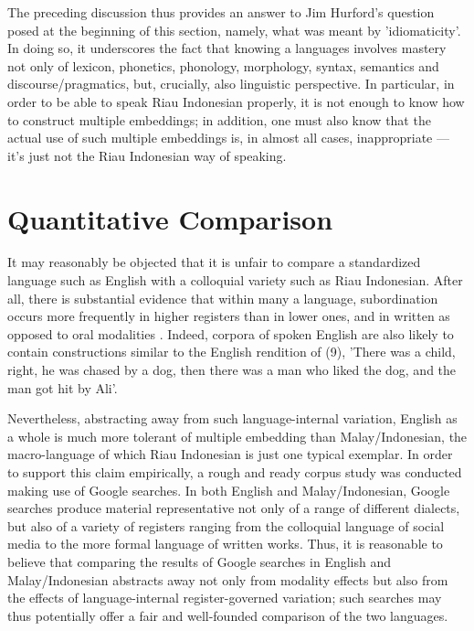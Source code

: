 \documentclass[output=paper,colorlinks,citecolor=brown
]{langscibook}
\begin{document}
The preceding discussion thus provides an answer to Jim Hurford's question posed at the beginning of this section, namely, what was meant by 'idiomaticity'.  In doing so, it underscores the fact that knowing a languages involves mastery not only of lexicon, phonetics, phonology, morphology, syntax, semantics and discourse/pragmatics, but, crucially, also linguistic perspective.  In particular, in order to be able to speak Riau Indonesian properly, it is not enough to know how to construct multiple embeddings; in addition, one must also know that the actual use of such multiple embeddings is, in almost all cases, inappropriate — it's just not the Riau Indonesian way of speaking.

\section{Quantitative Comparison}
It may reasonably be objected that it is unfair to compare a standardized language such as English with a colloquial variety such as Riau Indonesian.  After all, there is substantial evidence that within many a language, subordination occurs more frequently in higher registers than in lower ones, and in written as opposed to oral modalities \citep[and others]{givon1979understanding,deutscher2000syntactic,karlsson2009aorigin,karlsson2009bsyntactic}. Indeed, corpora of spoken English are also likely to contain constructions similar to the English rendition of (9), 'There was a child, right, he was chased by a dog, then there was a man who liked the dog, and the man got hit by Ali'. 

Nevertheless, abstracting away from such language-internal variation, English as a whole is much more tolerant of multiple embedding than Malay/Indonesian, the macro-language of which Riau Indonesian is just one typical exemplar.  In order to support this claim empirically, a rough and ready corpus study was conducted making use of Google searches.  In both English and Malay/Indonesian, Google searches produce material representative not only of a range of different dialects, but also of a variety of registers ranging from the colloquial language of social media to the more formal language of written works.  Thus, it is reasonable to believe that comparing the results of Google searches in English and Malay/Indonesian abstracts away not only from modality effects but also from the effects of language-internal register-governed variation; such searches may thus potentially offer a fair and well-founded comparison of the two languages.
\end{document}
